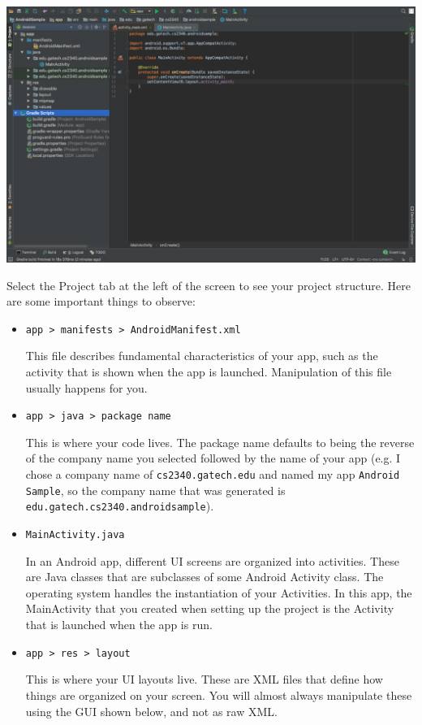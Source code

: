 \documentclass{article}
\begin{document}
\begin{center}\includegraphics[width=.5\textwidth]{images/ide.png}\end{center}
Select the Project tab at the left of the screen to see your project structure. Here are some important things to observe:
\begin{itemize}
\item \texttt{app > manifests > AndroidManifest.xml} 

This file describes fundamental characteristics of your app, such as the activity that is shown when the app is launched. Manipulation of this file usually happens for you.
\item \texttt{app > java > package name}

This is where your code lives. The package name defaults to being the reverse of the company name you selected followed by the name of your app (e.g. I chose a company name of \texttt{cs2340.gatech.edu} and named my app \texttt{Android Sample}, so the company name that was generated is \texttt{edu.gatech.cs2340.androidsample}).
\item \texttt{MainActivity.java}

In an Android app, different UI screens are organized into activities. These are Java classes that are subclasses of some Android Activity class. The operating system handles the instantiation of your Activities. In this app, the MainActivity that you created when setting up the project is the Activity that is launched when the app is run.
\item \texttt{app > res > layout}

This is where your UI layouts live. These are XML files that define how things are organized on your screen. You will almost always manipulate these using the GUI shown below, and not as raw XML.


\end{itemize}
\end{document}
